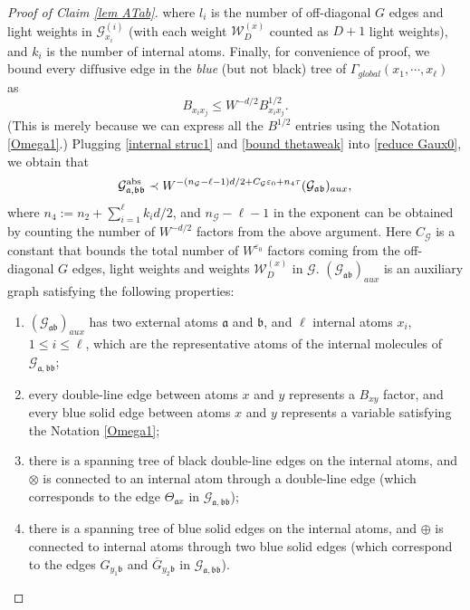 \documentclass{article}
\newcommand{\1}{\mathds{1}}
\numberwithin{equation}{section}
\newcommand{\be}{\begin{equation}}
\newcommand{\ee}{\end{equation}}
\newcommand{\e}{{\varepsilon}}
\newcommand{\fa}{{\mathfrak a}}
\newcommand{\fb}{{\mathfrak b}}
\renewcommand{\cal}{\mathcal}
\renewcommand{\leq}{\leqslant}
\renewcommand{\le}{\leq}
\newcommand{\dashed}{\text{diffusive}}
\theoremstyle{plain} %
\theoremstyle{remark}
\begin{document}
\begin{proof}[Proof of Claim \ref{lem ATab}]
where $l_i$ is the number of off-diagonal $G$ edges and light weights in $\cal G_{x_i}^{(i)}$ (with each weight $\cal W^{(x)}_D$ counted as $D+1$ light weights), and $k_i$ is the number of internal atoms. Finally, for convenience of proof, we bound every $\dashed$ edge in the \emph{blue} (but not black) tree of $\Gamma_{global}(x_1, \cdots, x_\ell)$ as
\be\label{bound thetaweak} B_{x_i x_j}\le W^{-d/2}B_{x_i x_j} ^{1/2}.\ee
(This is merely because we can express all the $B^{1/2}$ entries using the Notation \ref{Omega1}.) Plugging \eqref{internal struc1} and \eqref{bound thetaweak} into \eqref{reduce Gaux0}, we obtain that
\be\label{bound G aux}
\cal G^{\rm abs}_{\fa,\fb\fb}\prec W^{ -(n_{\cal G}-\ell - 1)d/2 + C_{\cal G}\e_0 + n_4\tau} (\cal G_{\fa\fb})_{aux},
\ee
where $n_4:=n_2+\sum_{i=1}^\ell k_i d/2$, and $n_{\cal G}-\ell -1$ in the exponent can be obtained by counting the number of $W^{-d/2}$ factors from the above argument. Here $C_{\cal G}$ is a constant that bounds the total number of $W^{\e_0}$ factors coming from the off-diagonal $G$ edges, light weights and weights $\cal W^{(x)}_D$ in $\cal G$. $(\cal G_{\fa\fb})_{aux}$ is an auxiliary graph satisfying the following properties: %
\begin{enumerate}
	\item $(\cal G_{\fa\fb})_{aux}$ has two external atoms $\fa$ and $\fb$, and $\ell$ internal atoms $x_i$, $1\le i \le \ell$, which are the representative atoms of the internal molecules of $\cal G_{\fa,\fb\fb}$;

	\item every double-line edge between atoms $x$ and $y$ represents a $B_{xy}$ factor, and every blue solid edge between atoms $x$ and $y$ represents a %
	variable satisfying the Notation \ref{Omega1};

	\item there is a spanning tree of black double-line edges on the internal atoms, and $\otimes$ is connected to an internal atom through a double-line edge (which corresponds to the edge $\Theta_{\fa x}$ in $\cal G_{\fa,\fb\fb}$); %

	\item there is a spanning tree of blue solid edges on the internal atoms, and $\oplus$ is connected to internal atoms through two blue solid edges (which correspond to the edges $G_{y_1\fb}$ and $\overline G_{y_2\fb}$ in $\cal G_{\fa,\fb\fb}$).
\end{enumerate}


\end{proof}
\end{document}
